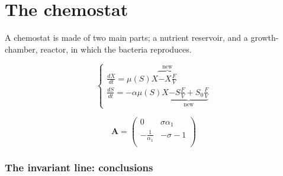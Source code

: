 \documentclass[a4paper, 10pt, twoside, openright]{book}
\begin{document}
\section{The chemostat} 

A chemostat is made of two main parts; a nutrient reservoir, and a
growth-chamber, reactor, in which the bacteria reproduces. 

\begin{equation} \label{chemo_basic}
\left\{ \begin{array}{l}
\frac{dX}{dt}= \mu(S)X \overbrace{-X\frac{F}{V}}^{\textrm{new}}  \\
\frac{dS}{dt}=- \alpha \mu(S) X
\underbrace{-S\frac{F}{V}+ {S}_{0}\frac{F}{V}}_{\textrm{new}} 
\end{array}\right.
\end{equation}

\begin{displaymath}
\mathbf{A} =
\left( \begin{array}{cc}
0 &  \sigma {\alpha}_{1}  \\
 - \frac{1}{{\alpha}_{1}} & -\sigma - 1 \\
\end{array}\right)
\end{displaymath}

\subsubsection*{The invariant line: conclusions}




\end{document}
